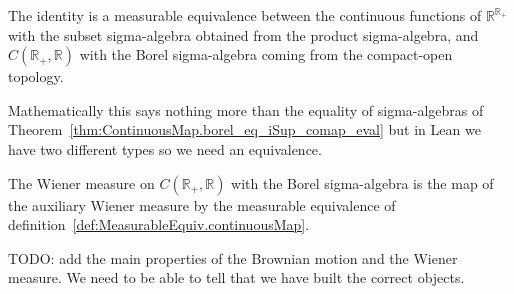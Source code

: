 \begin{definition}\label{def:MeasurableEquiv.continuousMap}
  \mathlibok
The identity is a measurable equivalence between the continuous functions of $\mathbb{R}^{\mathbb{R}_+}$ with the subset sigma-algebra obtained from the product sigma-algebra, and $C(\mathbb{R}_+, \mathbb{R})$ with the Borel sigma-algebra coming from the compact-open topology.

Mathematically this says nothing more than the equality of sigma-algebras of Theorem~\ref{thm:ContinuousMap.borel_eq_iSup_comap_eval} but in Lean we have two different types so we need an equivalence.
\end{definition}


\begin{definition}\label{def:wienerMeasure}
  \leanok
The Wiener measure on $C(\mathbb{R}_+, \mathbb{R})$ with the Borel sigma-algebra is the map of the auxiliary Wiener measure by the measurable equivalence of definition~\ref{def:MeasurableEquiv.continuousMap}.
\end{definition}


TODO: add the main properties of the Brownian motion and the Wiener measure.
We need to be able to tell that we have built the correct objects.
